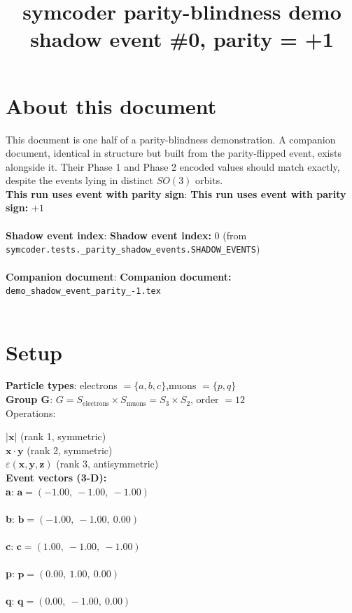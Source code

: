 \documentclass[a4paper,11pt]{article}
\title{symcoder parity-blindness demo\\\large shadow event \#0,  parity = +1}
\date{}
\newcommand{\vc}[1]{\ensuremath{\mathbf{#1}}}
\newcommand{\dnfagmiihhiejm}[1]{|\vc{#1}|}
\newcommand{\pdcegfomjfhook}[2]{\mathbf{#1} \cdot \mathbf{#2}}
\newcommand{\kblbmcpggoncpf}[3]{\varepsilon(\mathbf{#1},\mathbf{#2},\mathbf{#3})}
\begin{document}
\maketitle

\section{About this document}
This document is one half of a parity-blindness demonstration.  A companion document, identical in structure but built from the parity-flipped event, exists alongside it.  Their Phase 1 and Phase 2 encoded values should match exactly, despite the events lying in distinct $SO(3)$ orbits.\\[1ex]
\textbf{This run uses event with parity sign}: \textbf{This run uses event with parity sign:} $+1$\\\\
\textbf{Shadow event index}: \textbf{Shadow event index:} $0$ (from \texttt{symcoder.tests.\_parity\_shadow\_events.SHADOW\_EVENTS})\\\\
\textbf{Companion document}: \textbf{Companion document:} \texttt{demo\_shadow\_event\_parity\_-1.tex}\\\\

\section{Setup}
\textbf{Particle types}: electrons $= \{a, b, c\}$,\quad muons $= \{p, q\}$\\
\textbf{Group G}: $G = S_{\text{electrons}} \times S_{\text{muons}} = S_{3} \times S_{2}$, order $= 12$\\

Operations:

$\dnfagmiihhiejm{x}$ \quad (rank 1, symmetric)\\
$\pdcegfomjfhook{x}{y}$ \quad (rank 2, symmetric)\\
$\kblbmcpggoncpf{x}{y}{z}$ \quad (rank 3, antisymmetric)\\

\textbf{Event vectors (3-D):}\\
\textbf{  a}: $\vc{a} = (-1.00,\ -1.00,\ -1.00)$\\\\
\textbf{  b}: $\vc{b} = (-1.00,\ -1.00,\ 0.00)$\\\\
\textbf{  c}: $\vc{c} = (1.00,\ -1.00,\ -1.00)$\\\\
\textbf{  p}: $\vc{p} = (0.00,\ 1.00,\ 0.00)$\\\\
\textbf{  q}: $\vc{q} = (0.00,\ -1.00,\ 0.00)$\\\\
\end{document}
